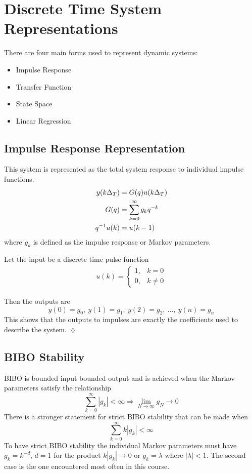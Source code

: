 \section{Discrete Time System Representations}
There are four main forms used to represent dynamic systems:
\begin{itemize}
\item Impulse Response
\item Transfer Function
\item State Space
\item Linear Regression
\end{itemize}

\subsection{Impulse Response Representation}
This system is represented as the total system response to individual impulse functions.
\begin{align*}
y(k\Delta_T) &= G(q)u(k\Delta_T) \\
G(q) &= \sum_{k=0}^\infty g_k q^{-k} \\
q^{-1}u(k) &= u(k-1)
\end{align*}
where $g_k$ is defined as the impulse response or Markov parameters.

\begin{example}
Let the input be a discrete time pulse function
\begin{align}
\label{eq:03impulse}
u(k) = \begin{cases} 1, & k=0 \\ 0, & k\neq 0 \end{cases}
\end{align}

Then the outputs are
$$y(0)=g_0,~y(1)=g_1,~y(2)=g_2,~\ldots,~y(n)=g_n$$
This shows that the outputs to impulses are exactly the coefficients used to describe the system.
$\lozenge$
\end{example}

\subsection{BIBO Stability}
\label{sec:bibostability}
BIBO is bounded input bounded output and is achieved when the Markov parameters satisfy the relationship
$$\sum_{k=0}^\infty |g_k| < \infty \Rightarrow \lim_{N\to \infty} g_N \to 0$$
There is a stronger statement for strict BIBO stability that can be made when
$$\sum_{k=0}^\infty k|g_k| < \infty$$
To have strict BIBO stability the individual Markov parameters must have $g_k=k^{-d}$, $d=1$ for the product $k|g_k|\to 0$ or $g_k=\lambda$ where $|\lambda|<1$.
The second case is the one encountered most often in this course.

